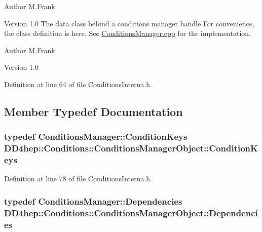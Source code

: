 \begin{DoxyAuthor}{Author}
M.Frank 
\end{DoxyAuthor}
\begin{DoxyVersion}{Version}
1.0 The data class behind a conditions manager handle For convenience, the class definition is here. See \hyperlink{_conditions_manager_8cpp}{ConditionsManager.cpp} for the implementation.
\end{DoxyVersion}
\begin{DoxyAuthor}{Author}
M.Frank 
\end{DoxyAuthor}
\begin{DoxyVersion}{Version}
1.0 
\end{DoxyVersion}


Definition at line 64 of file ConditionsInterna.h.

\subsection{Member Typedef Documentation}
\hypertarget{class_d_d4hep_1_1_conditions_1_1_conditions_manager_object_aad75140018040c6ad49e56a4d56a35ee}{
\subsubsection[{ConditionKeys}]{\setlength{\rightskip}{0pt plus 5cm}typedef {\bf ConditionsManager::ConditionKeys} {\bf DD4hep::Conditions::ConditionsManagerObject::ConditionKeys}}}
\label{class_d_d4hep_1_1_conditions_1_1_conditions_manager_object_aad75140018040c6ad49e56a4d56a35ee}


Definition at line 78 of file ConditionsInterna.h.\hypertarget{class_d_d4hep_1_1_conditions_1_1_conditions_manager_object_a539905074db3aee8b401d575649dbdd8}{
\subsubsection[{Dependencies}]{\setlength{\rightskip}{0pt plus 5cm}typedef {\bf ConditionsManager::Dependencies} {\bf DD4hep::Conditions::ConditionsManagerObject::Dependencies}}}
\label{class_d_d4hep_1_1_conditions_1_1_conditions_manager_object_a539905074db3aee8b401d575649dbdd8}


